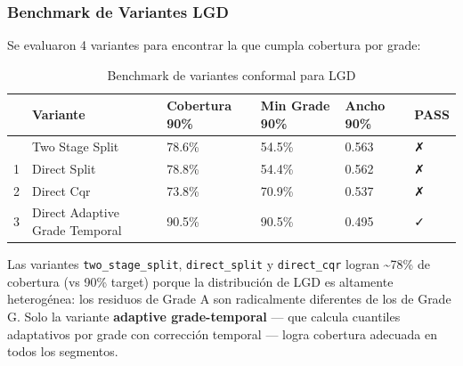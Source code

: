 \documentclass[
  spanish,
  11pt,
  letterpaper,
]{scrbook}
\theoremstyle{plain}
\theoremstyle{remark}
\begin{document}
\subsubsection{Benchmark de Variantes
LGD}\label{benchmark-de-variantes-lgd}

Se evaluaron 4 variantes para encontrar la que cumpla cobertura por
grade:

{

\begin{longtable}[]{@{}llllll@{}}

\caption{\label{tbl-lgd-variants}Benchmark de variantes conformal para
LGD}

\tabularnewline

\toprule\noalign{}
& Variante & Cobertura 90\% & Min Grade 90\% & Ancho 90\% & PASS \\
\midrule\noalign{}
\endhead
\bottomrule\noalign{}
\endlastfoot
0 & Two Stage Split & 78.6\% & 54.5\% & 0.563 & ✗ \\
1 & Direct Split & 78.8\% & 54.4\% & 0.562 & ✗ \\
2 & Direct Cqr & 73.8\% & 70.9\% & 0.537 & ✗ \\
3 & Direct Adaptive Grade Temporal & 90.5\% & 90.5\% & 0.495 & ✓ \\

\end{longtable}

}

\begin{tcolorbox}[enhanced jigsaw, arc=.35mm, bottomrule=.15mm, bottomtitle=1mm, breakable, colback=white, colbacktitle=quarto-callout-note-color!10!white, colframe=quarto-callout-note-color-frame, coltitle=black, left=2mm, leftrule=.75mm, opacityback=0, opacitybacktitle=0.6, rightrule=.15mm, title=\textcolor{quarto-callout-note-color}{\faInfo}\hspace{0.5em}{¿Por qué las variantes estándar fallan?}, titlerule=0mm, toprule=.15mm, toptitle=1mm]

Las variantes \texttt{two\_stage\_split}, \texttt{direct\_split} y
\texttt{direct\_cqr} logran \textasciitilde78\% de cobertura (vs 90\%
target) porque la distribución de LGD es altamente heterogénea: los
residuos de Grade A son radicalmente diferentes de los de Grade G. Solo
la variante \textbf{adaptive grade-temporal} --- que calcula cuantiles
adaptativos por grade con corrección temporal --- logra cobertura
adecuada en todos los segmentos.

\end{tcolorbox}
\end{document}

